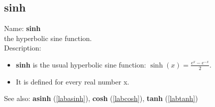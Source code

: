 \subsection{sinh}
\label{labsinh}
\noindent Name: \textbf{sinh}\\
the hyperbolic sine function.\\

\noindent Description: \begin{itemize}

\item \textbf{sinh} is the usual hyperbolic sine function: $\sinh(x) = \frac{e^x - e^{-x}}{2}$.

\item It is defined for every real number x.
\end{itemize}
See also: \textbf{asinh} (\ref{labasinh}), \textbf{cosh} (\ref{labcosh}), \textbf{tanh} (\ref{labtanh})
